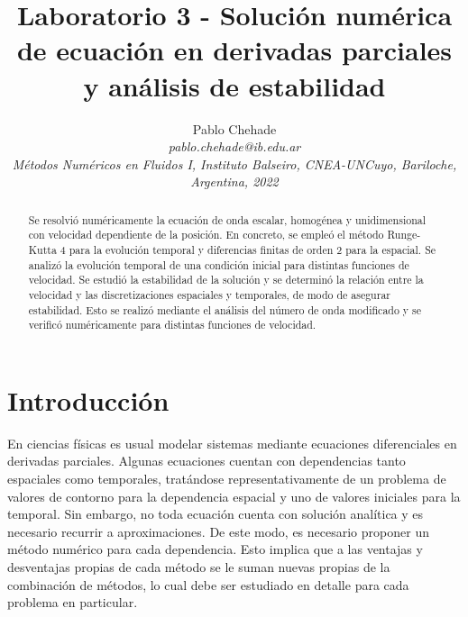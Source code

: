 \documentclass[aps,prb,twocolumn,superscriptaddress,floatfix,longbibliography,10pt]{revtex4-2}
\newcounter{para}
\begin{document}
\newcommand{\mytitle}{Laboratorio 3 - Solución numérica de ecuación en derivadas parciales y análisis de estabilidad}

\title{\mytitle}

\author{Pablo Chehade \\
    \small \textit{pablo.chehade@ib.edu.ar} \\
    \small \textit{Métodos Numéricos en Fluidos I, Instituto Balseiro, CNEA-UNCuyo, Bariloche, Argentina, 2022} \\}


\begin{abstract}

Se resolvió numéricamente la ecuación de onda escalar, homogénea y unidimensional con velocidad dependiente de la posición. En concreto, se empleó el método Runge-Kutta 4 para la evolución temporal y diferencias finitas de orden 2 para la espacial. Se analizó la evolución temporal de una condición inicial para distintas funciones de velocidad. Se estudió la estabilidad de la solución y se determinó la relación entre la velocidad y las discretizaciones espaciales y temporales, de modo de asegurar estabilidad. Esto se realizó mediante el análisis del número de onda modificado y se verificó numéricamente para distintas funciones de velocidad.

\end{abstract}

\maketitle

\section{Introducción}

En ciencias físicas es usual modelar sistemas mediante ecuaciones diferenciales en derivadas parciales. Algunas ecuaciones cuentan con dependencias tanto espaciales como temporales, tratándose representativamente de un problema de valores de contorno para la dependencia espacial y uno de valores iniciales para la temporal. Sin embargo, no toda ecuación cuenta con solución analítica y es necesario recurrir a aproximaciones. De este modo, es necesario proponer un método numérico para cada dependencia. Esto implica que a las ventajas y desventajas propias de cada método se le suman nuevas propias de la combinación de métodos, lo cual debe ser estudiado en detalle para cada problema en particular.
\end{document}
